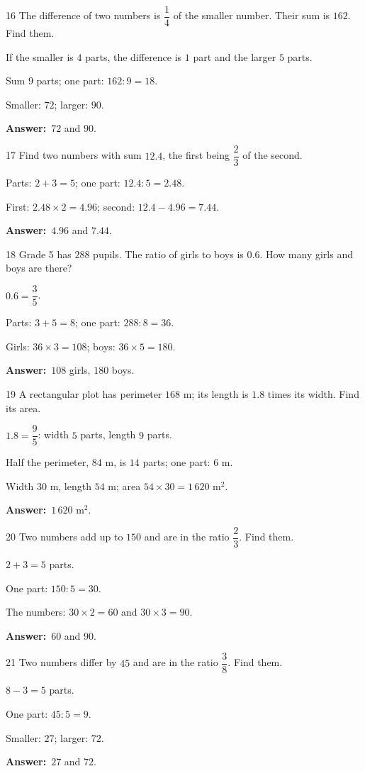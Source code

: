 \documentclass[11pt]{article}
\newif\ifsol \solfalse
\providecommand{\AnsWord}{Đáp số}
\newcommand{\dapso}[1]{\par\textbf{\AnsWord:}\ #1}
\newcommand{\probsol}[1]{%
  \begin{lrbox}{\solmeasure}\begin{minipage}{\dimexpr\linewidth-24pt\relax}#1\end{minipage}\end{lrbox}%
  \ifsol
    \begin{solbox}#1\end{solbox}%
  \else
    \setlength{\solht}{\dimexpr\ht\solmeasure+\dp\solmeasure+0.85cm\relax}%
    \ifdim\solht<1.35cm\setlength{\solht}{1.35cm}\fi
    \begin{tcolorbox}[colback=white,colframe=Line,boxrule=0.8pt,arc=5pt,
      left=8pt,right=8pt,top=4pt,bottom=4pt,height=\solht]{\footnotesize\color{Slate}\itshape\WorkWord}\end{tcolorbox}%
  \fi}
\newcommand{\gap}{\vspace{0.3cm}}
\def\WorkWord{Your work:}
\def\AnsWord{Answer}
\begin{document}
\gap
\begin{probbox}{16}{\relax}
The difference of two numbers is $\dfrac14$ of the smaller number. Their sum is $162$. Find them.
\end{probbox}
\probsol{
If the smaller is $4$ parts, the difference is $1$ part and the larger $5$ parts.\par Sum $9$ parts; one part: $162:9=18$.\par
Smaller: $72$; larger: $90$.
\dapso{$72$ and $90$.}}
\gap
\begin{probbox}{17}{\relax}
Find two numbers with sum $12.4$, the first being $\dfrac23$ of the second.
\end{probbox}
\probsol{
Parts: $2+3=5$; one part: $12.4:5=2.48$.\par First: $2.48\times2=4.96$; second: $12.4-4.96=7.44$.
\dapso{$4.96$ and $7.44$.}}
\gap
\begin{probbox}{18}{\relax}
Grade 5 has $288$ pupils. The ratio of girls to boys is $0.6$. How many girls and boys are there?
\end{probbox}
\probsol{
$0.6=\dfrac35$.\par Parts: $3+5=8$; one part: $288:8=36$.\par Girls: $36\times3=108$; boys: $36\times5=180$.
\dapso{$108$ girls, $180$ boys.}}
\gap
\begin{probbox}{19}{\relax}
A rectangular plot has perimeter $168$ m; its length is $1.8$ times its width. Find its area.
\end{probbox}
\probsol{
$1.8=\dfrac95$: width $5$ parts, length $9$ parts.\par Half the perimeter, $84$ m, is $14$ parts; one part: $6$ m.\par
Width $30$ m, length $54$ m; area $54\times30=1\,620$ m$^2$.
\dapso{$1\,620$ m$^2$.}}
\gap
\begin{probbox}{20}{\relax}
Two numbers add up to $150$ and are in the ratio $\dfrac23$. Find them.
\end{probbox}
\probsol{
$2+3=5$ parts.\par One part: $150:5=30$.\par The numbers: $30\times2=60$ and $30\times3=90$.
\dapso{$60$ and $90$.}}
\gap
\begin{probbox}{21}{\relax}
Two numbers differ by $45$ and are in the ratio $\dfrac38$. Find them.
\end{probbox}
\probsol{
$8-3=5$ parts.\par One part: $45:5=9$.\par Smaller: $27$; larger: $72$.
\dapso{$27$ and $72$.}}
\end{document}
